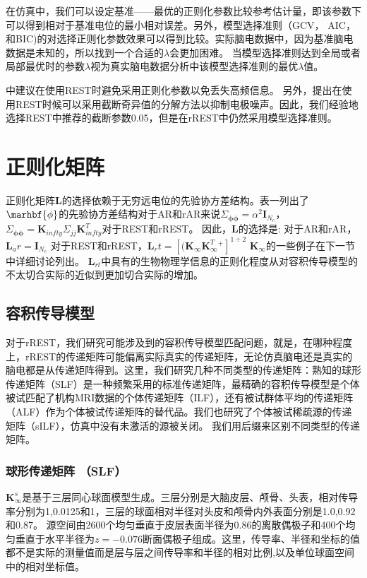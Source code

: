 在仿真中，我们可以设定基准——最优的正则化参数比较参考估计量，即该参数下可以得到相对于基准电位的最小相对误差。另外，模型选择准则（GCV，
AIC，和BIC)的对选择正则化参数效果可以得到比较。实际脑电数据中，因为基准脑电数据是未知的，所以找到一个合适的$\lambda$会更加困难。 当模型选择准则达到全局或者局部最优时的参数$\lambda$视为真实脑电数据分析中该模型选择准则的最优$\lambda$值。

\cite{yao_method_2001}中建议在使用REST时避免采用正则化参数以免丢失高频信息。 另外，\cite{zhai_y_and_yao_d_study_2004}提出在使用REST时候可以采用截断奇异值的分解方法以抑制电极噪声。因此，我们经验地选择REST中推荐的截断参数0.05，但是在rREST中仍然采用模型选择准则。
\section{正则化矩阵}
正则化矩阵$\mathbf{L}$的选择依赖于无穷远电位的先验协方差结构。表一列出了$\marhbf{\phi}$的先验协方差结构对于AR和rAR来说$\Sigma_{\mathbf{\phi\phi}}=\alpha^{2}\mathbf{I}_N_e$，$\Sigma_{\mathbf{\phi\phi}}=\mathbf{K}_{infty}\Sigma_{jj}\mathbf{K}_{infty}^{T}$对于REST和rREST。 因此，$\mathbf{L}$的选择是:
对于AR和rAR，$\mathbf{L}_ar=\mathbf{I}_N_e$
对于REST和rREST，$\mathbf{L}_rt=[(\mathbf{K}_{\infty}\mathbf{K}_{\infty}^{T}^+]^{1\div2}$
$\mathbf{K}_{\infty}$的一些例子在下一节中详细讨论列出。 $\mathbf{L}_{rt}$中具有的生物物理学信息的正则化程度从对容积传导模型的不太切合实际的近似到更加切合实际的增加。
\subsection{容积传导模型}
对于rREST，我们研究可能涉及到的容积传导模型匹配问题，就是，在哪种程度上，rREST的传递矩阵可能偏离实际真实的传递矩阵，无论仿真脑电还是真实的脑电都是从传递矩阵得到。这里，我们研究几种不同类型的传递矩阵：熟知的球形传递矩阵（SLF）是一种频繁采用的标准传递矩阵，最精确的容积传导模型是个体被试匹配了机构MRI数据的个体传递矩阵（ILF），还有被试群体平均的传递矩阵（ALF）作为个体被试传递矩阵的替代品。我们也研究了个体被试稀疏源的传递矩阵（sILF），仿真中没有未激活的源被关闭。 我们用后缀来区别不同类型的传递矩阵。
\subsubsection{球形传递矩阵 （SLF）}
$\mathbf{K}_{\infty}^{s}$是基于三层同心球面模型生成。三层分别是大脑皮层、颅骨、头表，相对传导率分别为1,0.0125和1，三层的球面相对半径对头皮和颅骨内外表面分别是1.0,0.92和0.87。 源空间由2600个均匀垂直于皮层表面半径为0.86的离散偶极子和400个均匀垂直于水平半径为$z=-0.076$断面偶极子组成。这里，传导率、半径和坐标的值都不是实际的测量值而是层与层之间传导率和半径的相对比例,以及单位球面空间中的相对坐标值。
